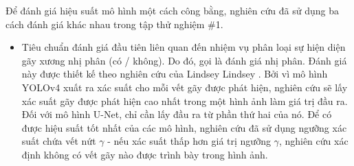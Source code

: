 \documentclass[../the.tex]{subfiles}
\begin{document}
{\fontsize{13}{12} \selectfont
Để đánh giá hiệu suất mô hình một cách công bằng, nghiên cứu đã sử dụng ba cách đánh giá khác nhau trong tập thử nghiệm \#1.

\begin{itemize}
  \item Tiêu chuẩn đánh giá đầu tiên liên quan đến nhiệm vụ phân loại sự hiện diện gãy xương nhị phân (có / không). Do đó, gọi là đánh giá nhị phân. Đánh giá này được thiết kế theo nghiên cứu của Lindsey Lindsey \etal  \cite{Lindsey1806905115}. Bởi vì mô hình YOLOv4 xuất ra xác suất cho mỗi vết gãy được phát hiện,  nghiên cứu sẽ lấy xác suất gãy được phát hiện cao nhất trong một hình ảnh làm giá trị đầu ra. Đối với mô hình U-Net, chỉ cần lấy đầu ra từ phần thứ hai của nó. Để có được hiệu suất tốt nhất của các mô hình, nghiên cứu đã sử dụng ngưỡng xác suất chứa vết nứt $\gamma$ - nếu xác suất thấp hơn giá trị ngưỡng $\gamma$, nghiên cứu xác định không có vết gãy nào được trình bày trong hình ảnh.


\end{itemize}}
\end{document}
